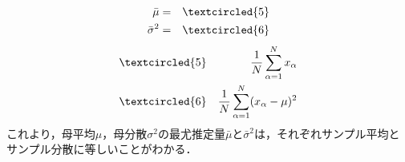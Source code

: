 \documentclass[a4paper,11pt]{jarticle}
\begin{document}
\begin{enumerate}
\begin{eqnarray}
 \bar{\mu} & = & \textcircled{\scriptsize 5} \\
 \bar{\sigma}^2 & = & \textcircled{\scriptsize 6}
\end{eqnarray}
\begin{eqnarray*}
 & \textcircled{\scriptsize 5} & \dfrac{1}{N} \sum^N_{\alpha=1} x_{\alpha} \\
 & \textcircled{\scriptsize 6} & \dfrac{1}{N} \sum^N_{\alpha=1} (x_{\alpha}-\mu)^2
\end{eqnarray*}
これより，母平均$ \mu $，母分散$ \sigma^2 $の最尤推定量$ \bar{\mu} $と$ \bar{\sigma}^2 $は，それぞれサンプル平均とサンプル分散に等しいことがわかる．
\end{enumerate}







\end{document}
